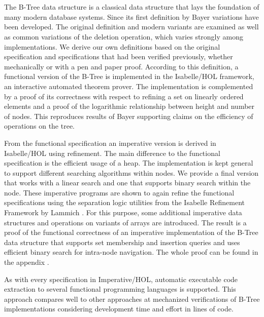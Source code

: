 \chapter{\abstractname}

The B-Tree data structure is a classical data structure
that lays the foundation of many modern database systems.
Since its first definition by Bayer \parencite{DBLP:journals/acta/BayerM72}
variations have been developed.
The original definition and modern variants are examined
as well as common variations of the deletion operation,
which varies strongly among implementations.
We derive our own definitions based on the original specification
and specifications that had been verified previously,
whether mechanically or with a pen and paper proof.
According to this definition, a functional version of the B-Tree
is implemented in the Isabelle/HOL framework,
an interactive automated theorem prover.
The implementation is complemented by a proof of its correctness
with respect to refining a set on linearly ordered elements
and a proof of the logarithmic relationship between height and number of nodes.
This reproduces results of Bayer \parencite{DBLP:journals/acta/BayerM72}
supporting claims on the efficiency of
operations on the tree.

From the functional specification an imperative version is
derived in Isabelle/HOL using refinement.
The main difference to the functional specification is the efficient
usage of a heap.
The implementation is kept general to support different
searching algorithms within nodes.
We provide a final version that works with a linear search
and one that supports binary search within the node.
These imperative programs are shown to again refine the functional specifications
using the separation logic utilities from the Isabelle Refinement Framework by
Lammich \parencite{DBLP:journals/jar/Lammich19}.
For this purpose, some additional imperative data structures
and operations on variants of arrays are introduced.
The result is a proof of the functional correctness
of an imperative implementation of the B-Tree data structure
that supports set membership and insertion queries
and uses efficient binary search for intra-node navigation.
The whole proof can be found in the appendix \parencite{MuendlerAppendix21}.

As with every specification in Imperative/HOL,
automatic executable code extraction to
several functional programming languages is supported.
This approach compares well to other approaches at mechanized
verifications of B-Tree implementations
considering development time and effort in lines of code.




